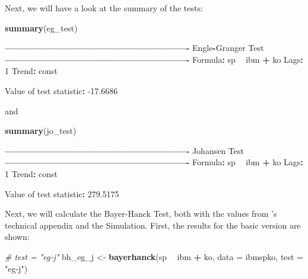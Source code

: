 \documentclass[11pt,a4paper]{article}
\newenvironment{Shaded}{\begin{snugshade}}{\end{snugshade}}
\newcommand{\CommentTok}[1]{\textcolor[rgb]{0.56,0.35,0.01}{\textit{#1}}}
\newcommand{\DataTypeTok}[1]{\textcolor[rgb]{0.13,0.29,0.53}{#1}}
\newcommand{\DecValTok}[1]{\textcolor[rgb]{0.00,0.00,0.81}{#1}}
\newcommand{\FloatTok}[1]{\textcolor[rgb]{0.00,0.00,0.81}{#1}}
\newcommand{\KeywordTok}[1]{\textcolor[rgb]{0.13,0.29,0.53}{\textbf{#1}}}
\newcommand{\NormalTok}[1]{#1}
\newcommand{\OperatorTok}[1]{\textcolor[rgb]{0.81,0.36,0.00}{\textbf{#1}}}
\newcommand{\StringTok}[1]{\textcolor[rgb]{0.31,0.60,0.02}{#1}}
\begin{document}
Next, we will have a look at the summary of the tests:

\begin{Shaded}
\begin{Highlighting}[]
\KeywordTok{summary}\NormalTok{(eg_test)}

\OperatorTok{----------------------------------------------------------}
\NormalTok{Engle}\OperatorTok{-}\NormalTok{Granger Test}
\OperatorTok{----------------------------------------------------------}
\NormalTok{Formula}\OperatorTok{:}\StringTok{ }\NormalTok{sp }\OperatorTok{~}\StringTok{ }\NormalTok{ibm }\OperatorTok{+}\StringTok{ }\NormalTok{ko}
\NormalTok{Lags}\OperatorTok{:}\StringTok{ }\DecValTok{1}
\NormalTok{Trend}\OperatorTok{:}\StringTok{ }\NormalTok{const}
 
\NormalTok{Value of test statistic}\OperatorTok{:}\StringTok{ }\FloatTok{-17.6686}
\end{Highlighting}
\end{Shaded}

and

\begin{Shaded}
\begin{Highlighting}[]
\KeywordTok{summary}\NormalTok{(jo_test)}

\OperatorTok{----------------------------------------------------------}
\NormalTok{Johansen Test}
\OperatorTok{----------------------------------------------------------}
\NormalTok{Formula}\OperatorTok{:}\StringTok{ }\NormalTok{sp }\OperatorTok{~}\StringTok{ }\NormalTok{ibm }\OperatorTok{+}\StringTok{ }\NormalTok{ko}
\NormalTok{Lags}\OperatorTok{:}\StringTok{ }\DecValTok{1}
\NormalTok{Trend}\OperatorTok{:}\StringTok{ }\NormalTok{const}
 
\NormalTok{Value of test statistic}\OperatorTok{:}\StringTok{ }\FloatTok{279.5175}
\end{Highlighting}
\end{Shaded}

Next, we will calculate the Bayer-Hanck Test, both with the values from
\textcite{Bayerhanck2009}'s technical appendix and the Simulation.
First, the results for the basic version are shown:

\begin{Shaded}
\begin{Highlighting}[]
\CommentTok{# test = "eg-j"}
\NormalTok{bh_eg_j <-}\StringTok{ }\KeywordTok{bayerhanck}\NormalTok{(sp }\OperatorTok{~}\StringTok{ }\NormalTok{ibm  }\OperatorTok{+}\StringTok{ }\NormalTok{ko, }\DataTypeTok{data =}\NormalTok{ ibmspko,}
                      \DataTypeTok{test =} \StringTok{"eg-j"}\NormalTok{)}
\end{Highlighting}
\end{Shaded}
\end{document}
